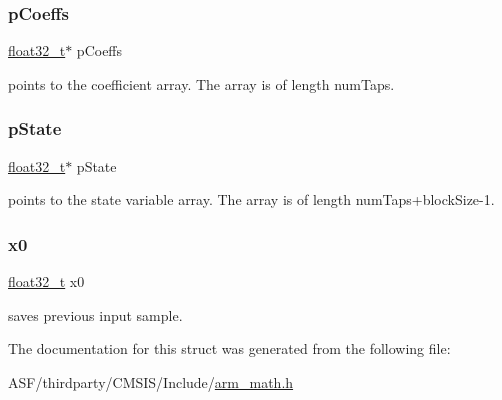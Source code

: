 \subsubsection{\texorpdfstring{pCoeffs}{pCoeffs}}
{\footnotesize\ttfamily \mbox{\hyperlink{arm__math_8h_a4611b605e45ab401f02cab15c5e38715}{float32\+\_\+t}}$\ast$ p\+Coeffs}

points to the coefficient array. The array is of length num\+Taps. \mbox{\label{structarm__lms__norm__instance__f32_a335c87e6fdc4b96601d95a5de8b9c463}} 
\subsubsection{\texorpdfstring{pState}{pState}}
{\footnotesize\ttfamily \mbox{\hyperlink{arm__math_8h_a4611b605e45ab401f02cab15c5e38715}{float32\+\_\+t}}$\ast$ p\+State}

points to the state variable array. The array is of length num\+Taps+block\+Size-\/1. \mbox{\label{structarm__lms__norm__instance__f32_ab56b6f83c5b324c3ef620474b6e5a6e1}} 
\subsubsection{\texorpdfstring{x0}{x0}}
{\footnotesize\ttfamily \mbox{\hyperlink{arm__math_8h_a4611b605e45ab401f02cab15c5e38715}{float32\+\_\+t}} x0}

saves previous input sample. 

The documentation for this struct was generated from the following file\+:\begin{DoxyCompactItemize}
\item 
A\+S\+F/thirdparty/\+C\+M\+S\+I\+S/\+Include/\mbox{\hyperlink{arm__math_8h}{arm\+\_\+math.\+h}}\end{DoxyCompactItemize}

